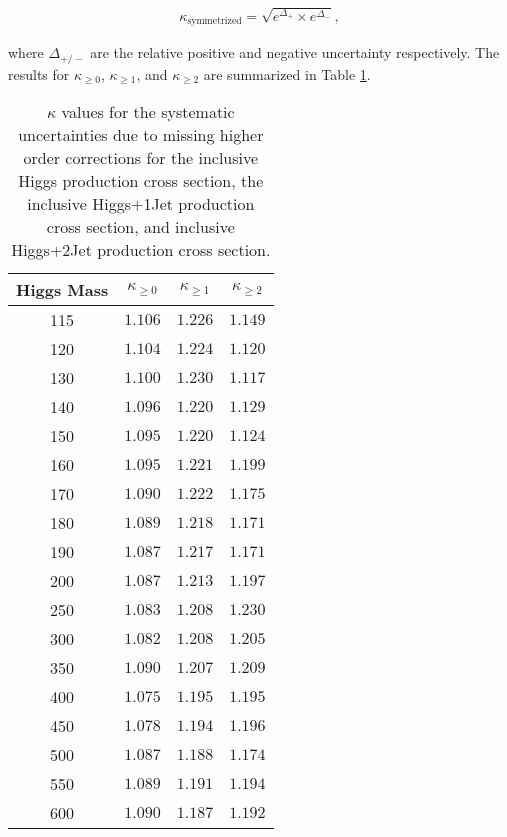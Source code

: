 \begin{eqnarray}
\label{eqn:kappaSymmetrization}
  \kappa_{\mathrm{symmetrized}} = \sqrt{e^{\Delta_{+}} \times e^{\Delta_{-}}} ,
\end{eqnarray}

where $\Delta_{\mathrm{+/-}}$ are the relative positive and negative uncertainty respectively.
The results for $\kappa_{\geq 0}$, $\kappa_{\geq 1}$, and $\kappa_{\geq 2}$ are summarized in Table 
\ref{tab:InclXS_ScaleVariation}.


\begin{table}[!htbp]
\begin{center}
\begin{tabular}{|c|c|c|c|}

\hline
Higgs Mass     &     $\kappa_{\geq 0}$        &   $\kappa_{\geq 1}$        &     $\kappa_{\geq 2}$       \\
\hline
 115 & $ 1.106$  & $ 1.226$  & $ 1.149$  \\
 120 & $ 1.104$  & $ 1.224$  & $ 1.120$  \\
 130 & $ 1.100$  & $ 1.230$  & $ 1.117$  \\
 140 & $ 1.096$  & $ 1.220$  & $ 1.129$  \\
 150 & $ 1.095$  & $ 1.220$  & $ 1.124$  \\
 160 & $ 1.095$  & $ 1.221$  & $ 1.199$  \\
 170 & $ 1.090$  & $ 1.222$  & $ 1.175$  \\
 180 & $ 1.089$  & $ 1.218$  & $ 1.171$  \\
 190 & $ 1.087$  & $ 1.217$  & $ 1.171$  \\
 200 & $ 1.087$  & $ 1.213$  & $ 1.197$  \\
 250 & $ 1.083$  & $ 1.208$  & $ 1.230$  \\
 300 & $ 1.082$  & $ 1.208$  & $ 1.205$  \\
 350 & $ 1.090$  & $ 1.207$  & $ 1.209$  \\
 400 & $ 1.075$  & $ 1.195$  & $ 1.195$  \\
 450 & $ 1.078$  & $ 1.194$  & $ 1.196$  \\
 500 & $ 1.087$  & $ 1.188$  & $ 1.174$  \\
 550 & $ 1.089$  & $ 1.191$  & $ 1.194$  \\
 600 & $ 1.090$  & $ 1.187$  & $ 1.192$  \\

\hline
\end{tabular}
\caption{ $\kappa$ values for the systematic uncertainties due to missing higher order corrections
for the inclusive Higgs production cross section, the inclusive Higgs+1Jet production cross section, 
and inclusive Higgs+2Jet production cross section. }
\label{tab:InclXS_ScaleVariation}
\end{center}
\end{table}


